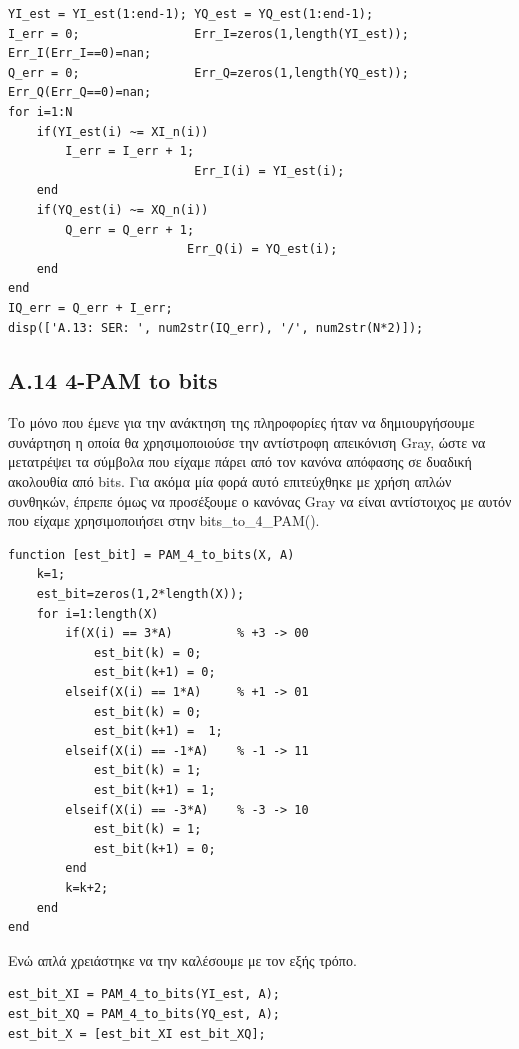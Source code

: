 \documentclass[11pt]{article}
\begin{document}
    \begin{lstlisting}[caption = {A.13 \texttt{Symbols errors}}]
% A.13
YI_est = YI_est(1:end-1); YQ_est = YQ_est(1:end-1);
I_err = 0;                Err_I=zeros(1,length(YI_est)); Err_I(Err_I==0)=nan;
Q_err = 0;                Err_Q=zeros(1,length(YQ_est)); Err_Q(Err_Q==0)=nan;
for i=1:N
    if(YI_est(i) ~= XI_n(i))
        I_err = I_err + 1;
                          Err_I(i) = YI_est(i);
    end
    if(YQ_est(i) ~= XQ_n(i))
        Q_err = Q_err + 1;
                         Err_Q(i) = YQ_est(i);
    end
end
IQ_err = Q_err + I_err;
disp(['A.13: SER: ', num2str(IQ_err), '/', num2str(N*2)]);
    \end{lstlisting}
    
    \subsection*{A.14 4-PAM to bits}
    Το μόνο που έμενε για την ανάκτηση της πληροφορίες ήταν να δημιουργήσουμε συνάρτηση η οποία θα χρησιμοποιούσε την αντίστροφη απεικόνιση Gray, ώστε να μετατρέψει τα σύμβολα που είχαμε πάρει από τον κανόνα απόφασης σε δυαδική ακολουθία από bits. 
    Για ακόμα μία φορά αυτό επιτεύχθηκε με χρήση απλών συνθηκών, έπρεπε όμως να προσέξουμε ο κανόνας Gray να είναι αντίστοιχος με αυτόν που είχαμε χρησιμοποιήσει στην bits\_to\_4\_PAM().
    
    \begin{lstlisting}[caption = {\texttt{PAM\_4\_to\_bits()}}]
function [est_bit] = PAM_4_to_bits(X, A)
    k=1;
    est_bit=zeros(1,2*length(X));
    for i=1:length(X)
        if(X(i) == 3*A)         % +3 -> 00
            est_bit(k) = 0;
            est_bit(k+1) = 0;
        elseif(X(i) == 1*A)     % +1 -> 01
            est_bit(k) = 0;
            est_bit(k+1) =  1;
        elseif(X(i) == -1*A)    % -1 -> 11
            est_bit(k) = 1;
            est_bit(k+1) = 1;
        elseif(X(i) == -3*A)    % -3 -> 10
            est_bit(k) = 1;
            est_bit(k+1) = 0;
        end
        k=k+2;
    end
end
    \end{lstlisting}
    
    \par \noindent
    Ενώ απλά χρειάστηκε να την καλέσουμε με τον εξής τρόπο.
    
    \begin{lstlisting}[caption = {A.14 \texttt{4-PAM to bits}}]
% A.14
est_bit_XI = PAM_4_to_bits(YI_est, A);
est_bit_XQ = PAM_4_to_bits(YQ_est, A);
est_bit_X = [est_bit_XI est_bit_XQ];
    \end{lstlisting}
    
\end{document}
